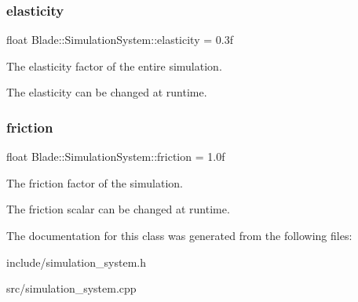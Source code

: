 \subsubsection{\texorpdfstring{elasticity}{elasticity}}
{\footnotesize\ttfamily float Blade\+::\+Simulation\+System\+::elasticity = 0.\+3f\hspace{0.3cm}{\ttfamily [static]}}



The elasticity factor of the entire simulation. 

The elasticity can be changed at runtime. \mbox{\label{class_blade_1_1_simulation_system_a899426b05cdf0fa83104ea106a2aab04}} 
\subsubsection{\texorpdfstring{friction}{friction}}
{\footnotesize\ttfamily float Blade\+::\+Simulation\+System\+::friction = 1.\+0f\hspace{0.3cm}{\ttfamily [static]}}



The friction factor of the simulation. 

The friction scalar can be changed at runtime. 

The documentation for this class was generated from the following files\+:\begin{DoxyCompactItemize}
\item 
include/simulation\+\_\+system.\+h\item 
src/simulation\+\_\+system.\+cpp\end{DoxyCompactItemize}
